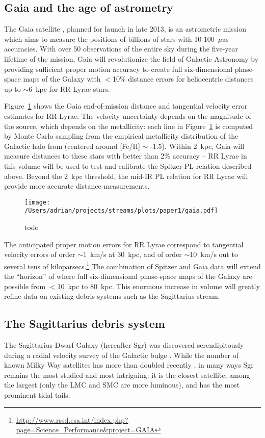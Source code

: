 \documentclass[preprint]{aastex}
\begin{document}
\subsection{Gaia and the age of astrometry}
\label{sec:gaia}
The Gaia satellite \citep{gaia01}, planned for launch in late 2013, is
an astrometric mission which aims to measure the positions of billions
of stars with 10-100~$\mu$as accuracies. With over 50 observations of
the entire sky during the five-year lifetime of the mission, Gaia will
revolutionize the field of Galactic Astronomy by providing sufficient
proper motion accuracy to create full six-dimensional phase-space maps
of the Galaxy with $<$10\% distance errors for heliocentric distances
up to $\sim$6~kpc for RR Lyrae stars.

Figure~\ref{fig:gaia_errors} shows the Gaia end-of-mission distance
and tangential velocity error estimates for RR Lyrae. The velocity
uncertainty depends on the magnitude of the source, which depends on
the metallicity: each line in Figure~\ref{fig:gaia_errors} is computed
by Monte Carlo sampling from the empirical metallicity distribution of
the Galactic halo from \cite{ivezic08} (centered around [Fe/H] $\sim$
-1.5). Within 2~kpc, Gaia will measure distances to these stars with
better than 2\% accuracy -- RR Lyrae in this volume will be used to
test and calibrate the Spitzer PL relation described above. Beyond the
2~kpc threshold, the mid-IR PL relation for RR Lyrae will provide more
accurate distance measurements.

\begin{figure}[h]
\begin{center}
\texttt{[image: /Users/adrian/projects/streams/plots/paper1/gaia.pdf]}
\caption{ todo }\label{fig:gaia_errors}
\end{center}
\end{figure}

The anticipated proper motion errors for RR Lyrae correspond to
tangential velocity errors of order $\sim$1~km/s at 30~kpc, and of
order $\sim$10~km/s out to several tens of
kiloparsecs.\footnote{\url{http://www.rssd.esa.int/index.php?page=Science_Performance&project=GAIA}}
The combination of Spitzer and Gaia data will extend the ``horizon''
of where full six-dimensional phase-space maps of the Galaxy are
possible from $<$10~kpc to 80~kpc. This enormous increase in volume
will greatly refine data on existing debris systems such as the
Sagittarius stream.

\subsection{The Sagittarius debris system}
\label{sec:sgr}
The Sagittarius Dwarf Galaxy (hereafter Sgr) was discovered
serendipitously during a radial velocity survey of the Galactic bulge
\citep{ibata94}. While the number of known Milky Way satellites has
more than doubled recently \citep[e.g.,][]{mcconnachie12}, in many
ways Sgr remains the most studied and most intriguing: it is the
closest satellite, among the largest (only the LMC and SMC are more
luminous), and has the most prominent tidal tails.
\end{document}
